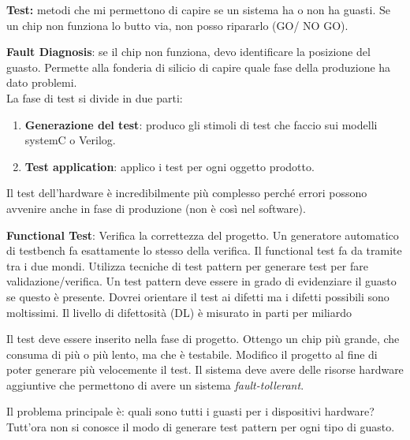 \documentclass[a4paper]{article}
\theoremstyle{definition}
\begin{document}
		\textbf{Test:} metodi che mi permettono di capire se un sistema ha o non ha guasti. Se un chip non funziona lo butto via, non posso ripararlo (GO/ NO GO).
		
		\textbf{Fault Diagnosis}: se il chip non funziona, devo identificare la posizione del guasto. Permette alla fonderia di silicio di capire quale fase della produzione ha dato problemi.\\
		La fase di test si divide in due parti:
		\begin{enumerate}
			\item \textbf{Generazione del test}: produco gli stimoli di test che faccio sui modelli systemC o Verilog.
			\item \textbf{Test application}: applico i test per ogni oggetto prodotto.
		\end{enumerate}
		
		Il test dell'hardware è incredibilmente più complesso perché errori possono avvenire anche in fase di produzione (non è così nel software).
		
		\textbf{Functional Test}: Verifica la correttezza del progetto. Un generatore automatico di testbench fa esattamente lo stesso della verifica. Il functional test fa da tramite tra i due mondi. 
		Utilizza tecniche di test pattern per generare test per fare validazione/verifica. 
		Un test pattern deve essere in grado di evidenziare il guasto se questo è presente. Dovrei orientare il test ai difetti ma i difetti possibili sono moltissimi. Il livello di difettosità (DL) è misurato in parti per miliardo
		
		Il test deve essere inserito nella fase di progetto. Ottengo un chip più grande, che consuma di più o più lento, ma che è testabile. Modifico il progetto al fine di poter generare più velocemente il test. 
		Il sistema deve avere delle risorse hardware aggiuntive che permettono di avere un sistema \textit{fault-tollerant}.
		
		Il problema principale è: quali sono tutti i guasti per i dispositivi hardware? Tutt'ora non si conosce il modo di generare test pattern per ogni tipo di guasto.
		
\end{document}
